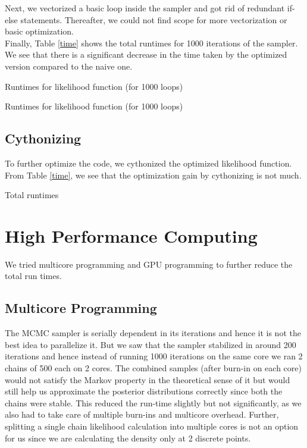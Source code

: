 \documentclass[11pt]{article}
\begin{document}
Next, we vectorized a basic loop inside the sampler and got rid of redundant if-else statements. Thereafter, we could not find scope for more vectorization or basic optimization.\\

Finally, Table \ref{time} shows the total runtimes for 1000 iterations of the sampler. We see that there is a significant decrease in the time taken by the optimized version compared to the naive one.

\begin{table}[ht]
\centering
\caption{Runtimes for likelihood function (for 1000 loops) \label{time_likeli}}

\end{table}

\begin{table}[ht]
\centering
\caption{Runtimes for likelihood function (for 1000 loops) \label{time_like}}

\end{table}

\subsection{Cythonizing}
To further optimize the code, we cythonized the optimized likelihood function. From Table \ref{time}, we see that the optimization gain by cythonizing is not much.

\begin{table}[ht]
\centering
\caption{Total runtimes \label{time}}

\end{table}

\section{High Performance Computing}
We tried multicore programming and GPU programming to further reduce the total run times.

\subsection{Multicore Programming}
The MCMC sampler is serially dependent in its iterations and hence it is not the best idea to parallelize it. But we saw that the sampler stabilized in around 200 iterations and hence instead of running 1000 iterations on the same core we ran 2 chains of 500 each on 2 cores. The combined samples (after burn-in on each core) would not satisfy the Markov property in the theoretical sense of it but would still help us approximate the posterior distributions correctly since both the chains were stable. This reduced the run-time slightly but not significantly, as we also had to take care of multiple burn-ins and multicore overhead. Further, splitting a single chain likelihood calculation into multiple cores is not an option for us since we are calculating the density only at 2 discrete points. 
\end{document}
